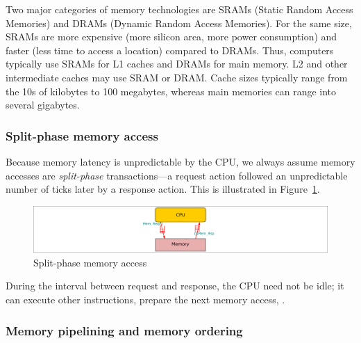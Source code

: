 
Two major categories of memory technologies are SRAMs (Static Random
Access Memories) and DRAMs (Dynamic Random Access Memories).  For the
same size, SRAMs are more expensive (more silicon area, more power
consumption) and faster (less time to access a location) compared to
DRAMs.  Thus, computers typically use SRAMs for L1 caches and DRAMs
for main memory. L2 and other intermediate caches may use SRAM or
DRAM.  Cache sizes typically range from the 10s of kilobytes to 100
megabytes, whereas main memories can range into several gigabytes.


\subsubsection{Split-phase memory access}



Because memory latency is unpredictable by the CPU, we always assume
memory accesses are \emph{split-phase} transactions---a request action
followed an unpredictable number of ticks later by a response action.
This is illustrated in Figure~\ref{Fig_BSV_Split_Phase_Mem}.
\begin{figure}[htbp]
\centerline{\includegraphics[width=6in,angle=0]{Figures/Fig_BSV_Split_Phase_Mem}}
\caption{\label{Fig_BSV_Split_Phase_Mem} Split-phase memory access}
\end{figure}
During the interval between request and response, the CPU need not be
idle; it can execute other instructions, prepare the next memory
access, {\etc}.


\subsubsection{Memory pipelining and memory ordering}

